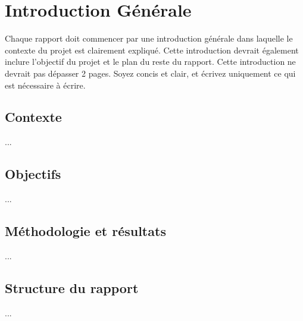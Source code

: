 \chapter{Introduction Générale}
Chaque rapport doit commencer par une introduction générale dans laquelle le contexte du projet est clairement expliqué. Cette introduction devrait également inclure l'objectif du projet et le plan du reste du rapport. Cette introduction ne devrait pas dépasser 2 pages. Soyez concis et clair, et écrivez uniquement ce qui est nécessaire à écrire.

\section{Contexte}
...
\section{Objectifs}
...
\section{Méthodologie et résultats }
...
\section{Structure du rapport}
...